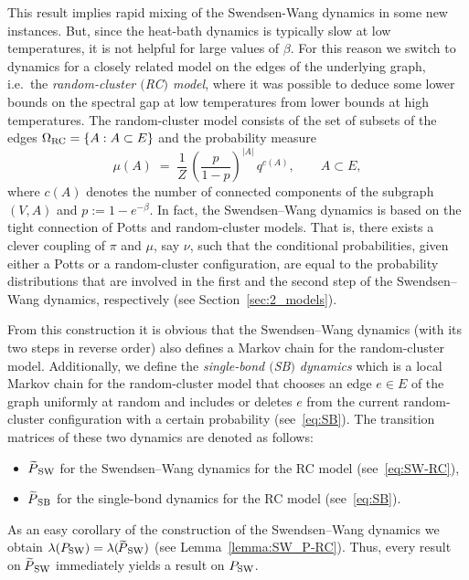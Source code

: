 \documentclass{dis}
\theoremstyle{citing}
\begin{document}
This result implies rapid mixing of the Swendsen-Wang dynamics in 
some new instances. But, since the heat-bath dynamics is typically 
slow at low temperatures, it is not helpful for large values of 
$\beta$. 
For this reason we switch to dynamics for a closely related 
model on the edges of the underlying graph, i.e.~the 
\emph{random-cluster $($RC\/$)$ model}, 
where it was possible to deduce some lower bounds on the spectral gap 
at low temperatures 
from lower bounds at high 
temperatures. 
The random-cluster model consists of the set 
of subsets of the edges ${{\Omega}_{\rm RC}}=\{A:A\subset E\}$ and the 
probability measure 
\[
\mu(A) \;=\; \frac1{Z}\,
\left(\frac{p}{1-p}\right)^{{\left\vert {A} \right\vert}}\,q^{c(A)},\qquad A\subset E, 
\]
where $c(A)$ denotes the number of connected components of the 
subgraph $(V,A)$ and $p:=1-e^{-\beta}$.
In fact, the Swendsen--Wang dynamics is based on the tight 
connection of Potts and random-cluster models. 
That is, there exists a clever coupling of $\pi$ and $\mu$, 
say $\nu$, such that the conditional probabilities, 
given either a Potts or a random-cluster configuration, 
are equal to the 
probability distributions that are involved in the first 
and the second step of the Swendsen--Wang dynamics, 
respectively (see Section~\ref{sec:2_models}). 

From this construction it is obvious that the Swendsen--Wang 
dynamics (with its two steps in reverse order) also defines a 
Markov chain for the random-cluster model. 
Additionally, we define the \emph{single-bond $($SB$)$ dynamics} 
which is a local Markov chain for the random-cluster model that 
chooses an edge $e\in E$ of the graph uniformly at random and 
includes or deletes $e$ from the current random-cluster 
configuration with a certain probability (see~\eqref{eq:SB}). 
The transition matrices of these two dynamics are denoted as follows:
\begin{itemize}
	\item ${{\raisebox{2pt}{ ${\widetilde{{}}}$ }\mkern-14mu P}_{\rm SW}}$ for the Swendsen--Wang dynamics for the 
					RC model (see~\eqref{eq:SW-RC}), \vspace{2mm}
	\item ${{\raisebox{2pt}{ ${\widetilde{{}}}$ }\mkern-14mu P}_{\rm SB}}$ for the single-bond dynamics for the 
					RC model (see~\eqref{eq:SB}). 
\end{itemize}

As an easy corollary of the construction of the 
Swendsen--Wang dynamics we obtain $\lambda({P_{\rm SW}})=\lambda({{\raisebox{2pt}{ ${\widetilde{{}}}$ }\mkern-14mu P}_{\rm SW}})$ 
(see Lemma~\ref{lemma:SW_P-RC}). 
Thus, every result on ${{\raisebox{2pt}{ ${\widetilde{{}}}$ }\mkern-14mu P}_{\rm SW}}$ immediately yields a result on ${P_{\rm SW}}$.
\end{document}
